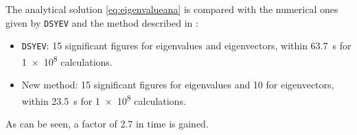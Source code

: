 The analytical solution \eqref{eq:eigenvalueana} is compared with the numerical ones given by \texttt{DSYEV} and the method described in \cite{Scherzinger:2008aa}:
\begin{itemize}
\item \texttt{DSYEV}: 15 significant figures for eigenvalues and eigenvectors, within \SI{63.7}{s} for \num{1e8} calculations.
\item New method: 15 significant figures for eigenvalues and 10 for eigenvectors, within \SI{23.5}{s} for \num{1e8} calculations.
\end{itemize}
As can be seen, a factor of 2.7 in time is gained.